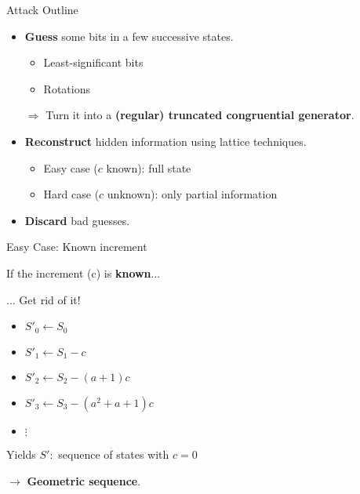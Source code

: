 \begin{frame}{Attack Outline}

\begin{itemize}
    \item \textbf{Guess} some bits in a few successive states.
    \begin{itemize}
          \item Least-significant bits
          \item Rotations
    \end{itemize}
      
    \medskip
      
    \item[$\Rightarrow$] Turn it into a \textbf{(regular) truncated congruential generator}.
      
    \medskip

    \item \textbf{Reconstruct} hidden information using lattice techniques.
    \begin{itemize}
          \item<2-> Easy case (\alert{$c$} known): full state
          \item<2-> Hard case (\alert{$c$} unknown): only partial information
      \end{itemize}
    
    \medskip
    
    \item \textbf{Discard} bad guesses.
\end{itemize}
\end{frame}



\begin{frame}{Easy Case: Known increment}

If the \alert{increment} (\alert{c}) is \textbf{known}...

\bigskip

\begin{exampleblock}{... Get rid of it!}
\begin{itemize}
    \item $S'_0 \gets S_0$
    \item $S'_1 \gets S_1 - c$
    \item $S'_2 \gets S_2 - (a+1)c$
    \item $S'_3 \gets S_3 - (a^2 + a + 1)c$
    \item $\vdots$
\end{itemize}
\end{exampleblock}

\bigskip

Yields $S' :$ sequence of states with $c=0$

$\rightarrow$ \textbf{Geometric sequence}.

\end{frame}



